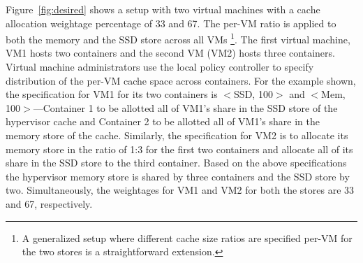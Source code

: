 Figure~\ref{fig:desired} shows a setup with two virtual machines
with a cache allocation weightage percentage of 33 and 67. 
The per-VM ratio is
applied to both the memory and the SSD store across all VMs
\footnote{A generalized setup where different cache size
ratios are specified per-VM for the two stores is a straightforward
extension.}.
%
The first virtual machine, VM1 hosts two containers and the second VM (VM2)
hosts three containers.
%
%
%
Virtual machine administrators use the local policy controller
to specify distribution of the per-VM cache space across containers.
%
For the example shown, the specification for VM1 for its two
containers is $<$SSD, 100$>$ and $<$Mem, 100$>$---Container 1 to be allotted
all of VM1's share in the SSD store of the hypervisor cache and Container 2
to be allotted all of VM1's share in the memory store of the cache.
%
Similarly, the specification for VM2 is to allocate its memory
store in the ratio of 1:3 for the first two containers and allocate
all of its share in the SSD store to the third container.
%
%
%
%
%
Based on the above specifications the hypervisor memory store
is shared by three containers and the SSD store by two.
%
Simultaneously, the weightages for VM1 and VM2 for both the stores
are 33 and 67, respectively.
%
%
%
%

